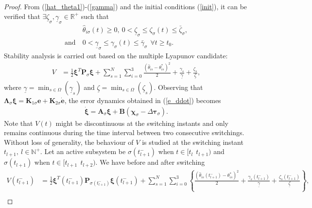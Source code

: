 \begin{proof}
From (\ref{hat_theta1})-(\ref{gamma}) and the initial conditions (\ref{init}), it can be verified that %
$\exists \underline{\zeta}_{\sigma}, \underline{\gamma}_{\sigma} \in \mathbb{R}^{+}$ such that
\begin{align}
&\hat{\theta}_{i\sigma} (t) \geq 0,~ 0<\underline{\zeta}_{\sigma} \leq \zeta_{ \sigma}(t) \leq \bar{\zeta}_{\sigma},\nonumber\\
\text{and}~&0<\underline{\gamma}_{\sigma} \leq \gamma_{ \sigma}(t) \leq \bar{\gamma}_{\sigma}~~\forall t\geq t_0. \label{low_bound}
\end{align}
	Stability analysis is carried out based on the multiple Lyapunov candidate:
	\begin{align}
	V& = \frac{1}{2} \boldsymbol{\xi}^T \mathbf{P}_{\sigma} \boldsymbol{\xi}  + \sum_{s=1}^{N} \sum_{i=0}^{3} \frac{(\hat{\theta}_{is} -{\theta}_{is}^{*})^2}{2} + \frac{\gamma_{s}}{\underline{\gamma}} + \frac{\zeta_{s}}{\underline{\zeta}} , \label{lyap}
	\end{align}
	where $\underline{\gamma}=\min_{s \in \Omega}( \underline{\gamma}_s )$ and $ \underline{\zeta}=\min_{s \in \Omega}( \underline{\zeta}_s )$. Observing that $\boldsymbol{\Lambda}_{\sigma} \boldsymbol{ \xi} =  \mathbf K_{1\sigma} \mathbf{e} + \mathbf K_{2\sigma} \dot{\mathbf e}$, the error dynamics obtained in (\ref{e_ddot}) becomes
	\begin{align}
	\dot{\boldsymbol \xi} = \mathbf{A}_{\sigma} \boldsymbol \xi + \mathbf{B} \left(\boldsymbol \chi_{\sigma} - \Delta \boldsymbol \tau_{\sigma}\right).  \label{error_dyn}
	\end{align}
	Note that $V(t)$ might be discontinuous at the switching instants and only remains continuous during the time interval between two consecutive switchings. Without loss of generality, the behaviour of $V$ is studied at the switching instant $t_{l+1},~ l \in \mathbb{N}^{+}$. Let an active subsystem be ${\sigma({t_{l+1}^{-}})}$ when $t \in [t_l~~t_{l+1})$ and ${\sigma({t_{l+1}})}$ when $t \in [t_{l+1}~~t_{l+2})$. We have before and after switching
	\begin{align*}
	V({t_{l+1}^{-}}) &= \frac{1}{2}\boldsymbol{\xi}^T({t_{l+1}^{-}}) \mathbf{P}_{\sigma({t_{l+1}^{-}})} \boldsymbol{\xi}({t_{l+1}^{-}})+  \sum_{s=1}^{N} \sum_{i=0}^{3} \left \lbrace \frac{(\hat{\theta}_{is}({t_{l+1}^{-}}) -{\theta}_{is}^{*})^2}{2} + \frac{ \gamma_{s}({t_{l+1}^{-}})}{ \underline{\gamma}}+ \frac{\zeta_{s}({t_{l+1}^{-}})}{ \underline{\zeta} } \right \rbrace ,\\

\end{align*}
\end{proof}
